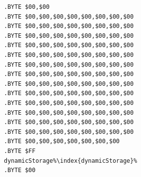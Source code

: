 \begin{minipage}[b]{1\linewidth}
\begin{minipage}[b]{0.33\linewidth}
\begin{lrbox}{\mybox}
\begin{lstlisting}[basicstyle=\ttfamily\tiny,escapechar=\%]
.BYTE $00,$00
.BYTE $00,$00,$00,$00,$00,$00,$00,$00
.BYTE $00,$00,$00,$00,$00,$00,$00,$00
.BYTE $00,$00,$00,$00,$00,$00,$00,$00
.BYTE $00,$00,$00,$00,$00,$00,$00,$00
.BYTE $00,$00,$00,$00,$00,$00,$00,$00
.BYTE $00,$00,$00,$00,$00,$00,$00,$00
.BYTE $00,$00,$00,$00,$00,$00,$00,$00
.BYTE $00,$00,$00,$00,$00,$00,$00,$00
.BYTE $00,$00,$00,$00,$00,$00,$00,$00
.BYTE $00,$00,$00,$00,$00,$00,$00,$00
.BYTE $00,$00,$00,$00,$00,$00,$00,$00
.BYTE $00,$00,$00,$00,$00,$00,$00,$00
.BYTE $00,$00,$00,$00,$00,$00,$00,$00
.BYTE $00,$00,$00,$00,$00,$00,$00
.BYTE $FF
dynamicStorage%\index{dynamicStorage}%
.BYTE $00
\end{lstlisting}
\end{lrbox}%
\scalebox{0.8}{\usebox{\mybox}}
\end{minipage}
\end{minipage}
